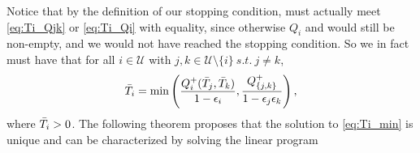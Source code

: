 Notice that by the definition of our stopping condition,  must actually meet \eqref{eq:Ti_Qjk} or \eqref{eq:Ti_Qi} with equality, since otherwise $Q_i$ and  would still be non-empty, and we would not have reached the stopping condition.  So we in fact must have that for all $i \in \mathcal{U}$ with $j,k \in \mathcal{U}\setminus \{i\} \ s.t. \ j \neq k$,
%
\begin{equation}
\label{eq:Ti_min}
	\bar{T}_{i} = \min\left(\frac{Q_{i}^{+}(\bar{T}_{j},\bar{T}_{k}) }{1 - \epsilon_i}, \frac{Q_{\{j,k\}}^{+}}{1 - \epsilon_j\epsilon_k} \right),
\end{equation}
where $\bar{T}_{i} > 0$.
The following theorem proposes that the solution to \eqref{eq:Ti_min} is unique and can be characterized by solving the linear program 

